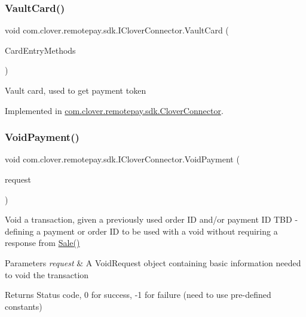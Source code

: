 \subsubsection{\texorpdfstring{Vault\+Card()}{VaultCard()}}
{\footnotesize\ttfamily void com.\+clover.\+remotepay.\+sdk.\+I\+Clover\+Connector.\+Vault\+Card (\begin{DoxyParamCaption}\item[{int?}]{Card\+Entry\+Methods }\end{DoxyParamCaption})}



Vault card, used to get payment token 



Implemented in \hyperlink{classcom_1_1clover_1_1remotepay_1_1sdk_1_1_clover_connector_a26e95230422276f47542882628b5038f}{com.\+clover.\+remotepay.\+sdk.\+Clover\+Connector}.

\mbox{\label{interfacecom_1_1clover_1_1remotepay_1_1sdk_1_1_i_clover_connector_af35e223ba760d0a6d61c67895c619997}} 
\subsubsection{\texorpdfstring{Void\+Payment()}{VoidPayment()}}
{\footnotesize\ttfamily void com.\+clover.\+remotepay.\+sdk.\+I\+Clover\+Connector.\+Void\+Payment (\begin{DoxyParamCaption}\item[{\hyperlink{classcom_1_1clover_1_1remotepay_1_1sdk_1_1_void_payment_request}{Void\+Payment\+Request}}]{request }\end{DoxyParamCaption})}



Void a transaction, given a previously used order ID and/or payment ID T\+BD -\/ defining a payment or order ID to be used with a void without requiring a response from \hyperlink{interfacecom_1_1clover_1_1remotepay_1_1sdk_1_1_i_clover_connector_acc92394e6902137c559510e498e78529}{Sale()} 


\begin{DoxyParams}{Parameters}
{\em request} & A Void\+Request object containing basic information needed to void the transaction\\
\hline
\end{DoxyParams}
\begin{DoxyReturn}{Returns}
Status code, 0 for success, -\/1 for failure (need to use pre-\/defined constants)
\end{DoxyReturn}


